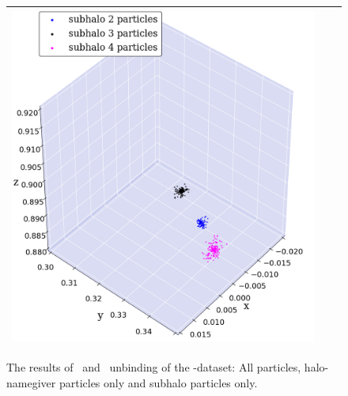 \begin{subfigures}
\begin{figure}[!htbp]
{\begin{tabular}{|p{.5cm} c c|}
				{\includegraphics[width = .42\textwidth]{images/cosmo/cos-halo-66858-subhalo-only-iter.png}} \\
				\hline
			\end{tabular}
			\caption{\label{fig:cosmo_results_b}
				The results of \neigh\ and \iter\ unbinding of the \cosmo-dataset: All particles, halo-namegiver particles only and subhalo particles only.
			}
		}
	\end{figure}
	\label{fig:cosmo_results}
\end{subfigures}






































